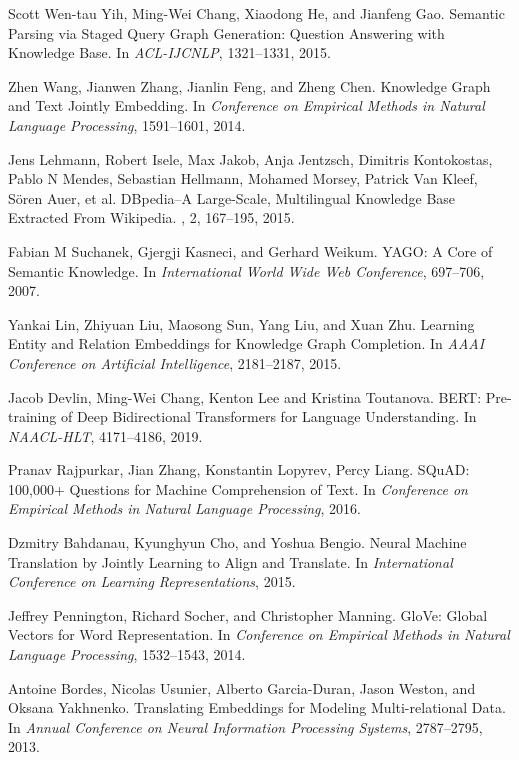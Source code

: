 \documentclass[11pt]{article}
\begin{document}
\begin{thebibliography}{10}
\begin{small}
 Scott Wen-tau Yih, Ming-Wei Chang, Xiaodong He, and Jianfeng Gao.  \newblock Semantic Parsing via Staged Query Graph Generation: Question Answering with Knowledge Base. \newblock In {\em ACL-IJCNLP}, 1321--1331, 2015.

 Zhen Wang, Jianwen Zhang, Jianlin Feng, and Zheng Chen.  \newblock  Knowledge Graph and Text Jointly Embedding. \newblock In {\em Conference on Empirical Methods in Natural Language Processing}, 1591--1601, 2014.


 Jens Lehmann, Robert Isele, Max Jakob, Anja Jentzsch, Dimitris Kontokostas, Pablo N Mendes, Sebastian Hellmann, Mohamed Morsey, Patrick Van Kleef, Sören Auer, et al.  \newblock   DBpedia–A Large-Scale, Multilingual Knowledge Base Extracted From Wikipedia. , 2, 167--195, 2015.

 Fabian M Suchanek, Gjergji Kasneci, and Gerhard Weikum.  \newblock   YAGO: A Core of Semantic Knowledge. \newblock In {\em International World Wide Web Conference}, 697--706, 2007.

 Yankai Lin, Zhiyuan Liu, Maosong Sun, Yang Liu, and Xuan Zhu.  \newblock  Learning Entity and Relation Embeddings for Knowledge Graph Completion. \newblock In {\em AAAI Conference on Artificial Intelligence}, 2181--2187, 2015.

 Jacob Devlin, Ming-Wei Chang, Kenton Lee and Kristina Toutanova. \newblock BERT: Pre-training of Deep Bidirectional Transformers for Language Understanding. \newblock In {\em NAACL-HLT}, 4171--4186, 2019.


 Pranav Rajpurkar, Jian Zhang, Konstantin Lopyrev, Percy Liang.  \newblock   SQuAD: 100,000+ Questions for Machine Comprehension of Text. \newblock In {\em Conference on Empirical Methods in Natural Language Processing}, 2016.

 Dzmitry Bahdanau, Kyunghyun Cho, and Yoshua Bengio.  \newblock  Neural Machine Translation by Jointly Learning to Align and Translate. \newblock In {\em International Conference on Learning Representations}, 2015.

 Jeffrey Pennington, Richard Socher, and Christopher Manning. \newblock  GloVe: Global Vectors for Word Representation. \newblock In {\em Conference on Empirical Methods in Natural Language Processing}, 1532--1543, 2014.

 Antoine Bordes, Nicolas Usunier, Alberto Garcia-Duran, Jason Weston, and Oksana Yakhnenko. \newblock  Translating Embeddings for Modeling Multi-relational Data. \newblock In {\em Annual Conference on Neural Information Processing Systems}, 2787--2795, 2013.


\end{small}
\end{thebibliography}
\end{document}
